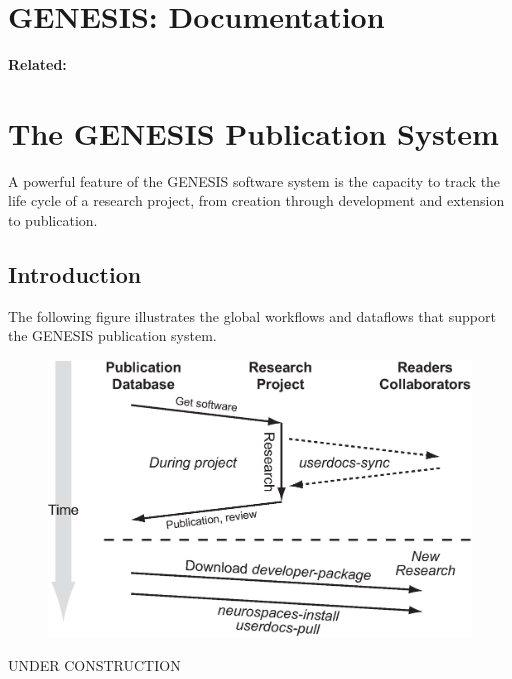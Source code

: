 \documentclass[12pt]{article}
\begin{document}
\section*{GENESIS: Documentation}

{\bf Related:}

\section*{The GENESIS Publication System}

A powerful feature of the GENESIS software system is the capacity to track the life cycle of a research project, from creation through development and extension to publication.

\subsection*{Introduction}

The following figure illustrates the global workflows and dataflows that support the GENESIS publication system.

\begin{figure}[h]
  \centering
   \includegraphics[scale=0.6]{figures/global-workdata-flow.eps}
  \label{fig:wf-1}
\end{figure}



UNDER CONSTRUCTION
\end{document}
